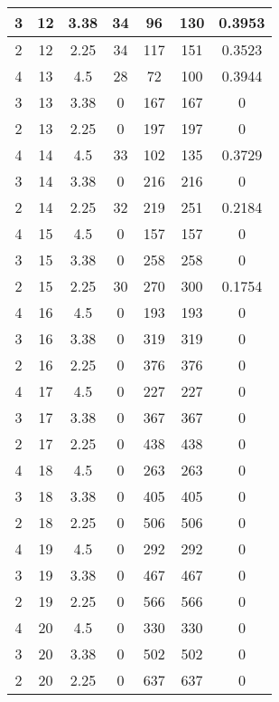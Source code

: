 \documentclass[letterpaper, 12pt]{article}
\begin{document}
\begin{longtable}{|c|c|c|c|c|c|c|}
\hline
3 & 12 & 3.38 & 34 & 96 & 130 & 0.3953 \\
\hline
2 & 12 & 2.25 & 34 & 117 & 151 & 0.3523 \\
\hline
4 & 13 & 4.5 & 28 & 72 & 100 & 0.3944 \\
\hline
3 & 13 & 3.38 & 0 & 167 & 167 & 0 \\
\hline
2 & 13 & 2.25 & 0 & 197 & 197 & 0 \\
\hline
4 & 14 & 4.5 & 33 & 102 & 135 & 0.3729 \\
\hline
3 & 14 & 3.38 & 0 & 216 & 216 & 0 \\
\hline
2 & 14 & 2.25 & 32 & 219 & 251 & 0.2184 \\
\hline
4 & 15 & 4.5 & 0 & 157 & 157 & 0 \\
\hline
3 & 15 & 3.38 & 0 & 258 & 258 & 0 \\
\hline
2 & 15 & 2.25 & 30 & 270 & 300 & 0.1754 \\
\hline
4 & 16 & 4.5 & 0 & 193 & 193 & 0 \\
\hline
3 & 16 & 3.38 & 0 & 319 & 319 & 0 \\
\hline
2 & 16 & 2.25 & 0 & 376 & 376 & 0 \\
\hline
4 & 17 & 4.5 & 0 & 227 & 227 & 0 \\
\hline
3 & 17 & 3.38 & 0 & 367 & 367 & 0 \\
\hline
2 & 17 & 2.25 & 0 & 438 & 438 & 0 \\
\hline
4 & 18 & 4.5 & 0 & 263 & 263 & 0 \\
\hline
3 & 18 & 3.38 & 0 & 405 & 405 & 0 \\
\hline
2 & 18 & 2.25 & 0 & 506 & 506 & 0 \\
\hline
4 & 19 & 4.5 & 0 & 292 & 292 & 0 \\
\hline
3 & 19 & 3.38 & 0 & 467 & 467 & 0 \\
\hline
2 & 19 & 2.25 & 0 & 566 & 566 & 0 \\
\hline
4 & 20 & 4.5 & 0 & 330 & 330 & 0 \\
\hline
3 & 20 & 3.38 & 0 & 502 & 502 & 0 \\
\hline
2 & 20 & 2.25 & 0 & 637 & 637 & 0 \\
\hline
\end{longtable}
\end{document}
